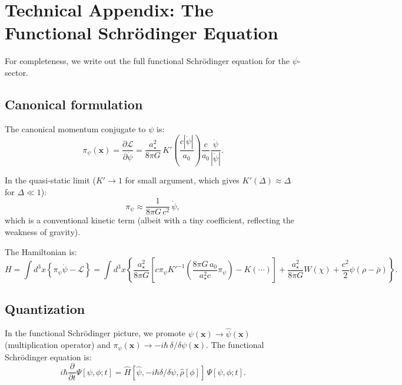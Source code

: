 \documentclass[12pt,a4paper]{article}
\begin{document}
\section{Technical Appendix: The Functional Schr\"odinger Equation}
\label{sec:appendix}

For completeness, we write out the full functional Schr\"odinger
equation for the $\psi$-sector.

\subsection{Canonical formulation}

The canonical momentum conjugate to $\psi$ is:
\begin{equation}
\pi_\psi(\mathbf{x}) = \frac{\partial\mathcal{L}}{\partial\dot\psi}
= \frac{a_\star^2}{8\pi G}\,K'\!\left(\frac{c|\dot\psi|}{a_0}\right)
\frac{c}{a_0}\frac{\dot\psi}{|\dot\psi|}.
\end{equation}

In the quasi-static limit ($K' \to 1$ for small argument, which gives
$K'(\Delta) \approx \Delta$ for $\Delta \ll 1$):
\begin{equation}
\pi_\psi \approx \frac{1}{8\pi G\,c^2}\,\dot\psi,
\end{equation}
which is a conventional kinetic term (albeit with a tiny coefficient,
reflecting the weakness of gravity).

The Hamiltonian is:
\begin{equation}
H = \int d^3x\left\{
\pi_\psi\dot\psi - \mathcal{L}
\right\}
= \int d^3x\left\{
\frac{a_\star^2}{8\pi G}\left[
c\pi_\psi K'^{-1}\!\left(\frac{8\pi G\,a_0}{a_\star^2 c}\pi_\psi\right)
- K(\cdots)
\right]
+ \frac{a_\star^2}{8\pi G}W(\chi)
+ \frac{c^2}{2}\psi(\rho - \bar\rho)
\right\}.
\end{equation}

\subsection{Quantization}

In the functional Schr\"odinger picture, we promote
$\psi(\mathbf{x}) \to \hat\psi(\mathbf{x})$ (multiplication operator)
and $\pi_\psi(\mathbf{x}) \to -i\hbar\,\delta/\delta\psi(\mathbf{x})$.
The functional Schr\"odinger equation is:
\begin{equation}
i\hbar\frac{\partial}{\partial t}\Psi[\psi,\phi;t]
= \hat{H}[\hat\psi, -i\hbar\delta/\delta\psi, \hat\rho[\phi]]\,
\Psi[\psi,\phi;t].
\end{equation}
\end{document}
